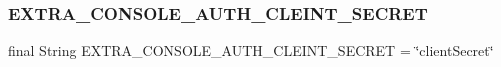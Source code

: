 \subsubsection{\texorpdfstring{E\+X\+T\+R\+A\+\_\+\+C\+O\+N\+S\+O\+L\+E\+\_\+\+A\+U\+T\+H\+\_\+\+C\+L\+E\+I\+N\+T\+\_\+\+S\+E\+C\+R\+ET}{EXTRA\_CONSOLE\_AUTH\_CLEINT\_SECRET}}
{\footnotesize\ttfamily final String E\+X\+T\+R\+A\+\_\+\+C\+O\+N\+S\+O\+L\+E\+\_\+\+A\+U\+T\+H\+\_\+\+C\+L\+E\+I\+N\+T\+\_\+\+S\+E\+C\+R\+ET = \char`\"{}client\+Secret\char`\"{}\hspace{0.3cm}{\ttfamily [static]}}

